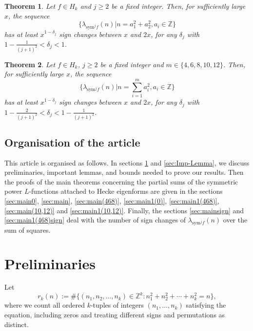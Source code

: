 \documentclass[10pt]{amsart}
\newtheorem{theorem}{Theorem}
\begin{document}
\begin{theorem} \label{thm:mainsign}
    Let $f \in H_k$ and $j \geq 2$ be a fixed integer. Then, for sufficiently large $x$, the sequence $$\{ \lambda_{\mathrm{sym}^jf}(n) | n = a_1^2+a_2^2 , a_i \in \mathbb{Z} \}$$ has at least $x^{1-\delta_j}$ sign changes between $x$ and $2x$, for any $\delta_j $ with $1-\frac{1}{(j+1)^2}  < \delta_j < 1$.
\end{theorem}


\begin{theorem} \label{thm:main1(468)sign}
        Let $f \in H_k$, $j \geq 2$ be a fixed integer and $ m \in \{4,6,8, 10, 12\}$. Then, for sufficiently large $x$, the sequence
        $$\{ \lambda_{\mathrm{sym}^jf}(n) | n = \sum_{i=1}^{m}a_i^2 , a_i \in \mathbb{Z} \}$$ has at least $x^{1-\delta_j}$ sign changes between $x$ and $2x$, for any $\delta_j $ with $1-\frac{2}{(j+1)^2}  < \delta_j < 1-\frac{1}{(j+1)^2}$.
\end{theorem}

\subsection*{Organisation of the article}
This article is organised as follows. In sections \ref{sec:Prel} and \ref{sec:Imp-Lemma}, we discuss preliminaries, important lemmas, and bounds needed to prove our results. Then the proofs of the main theorems concerning the partial sums of the symmetric power $L$-functions attached to Hecke eigenforms are given in the sections \ref{sec:main0}, \ref{sec:main}, \ref{sec:main(468)}, \ref{sec:main1(0)}, \ref{sec:main1(468)}, \ref{sec:main(10,12)} and \ref{sec:main1(10,12)}. Finally, the sections \ref{sec:mainsign} and \ref{sec:main1(468)sign} deal with the number of sign changes of $\lambda_{\mathrm{sym}^jf}(n)$ over the sum of squares. 


\section{Preliminaries} \label{sec:Prel}

Let
\[
r_k(n) := \#\bigl\{(n_1, n_2, \dots, n_k) \in \mathbb{Z}^k : n_1^2 + n_2^2 + \cdots + n_k^2 = n\bigr\},
\]
where we count all ordered $k$-tuples of integers $(n_1,\dots,n_k)$ satisfying the equation, 
including zeros and treating different signs and permutations as distinct. 
\end{document}
